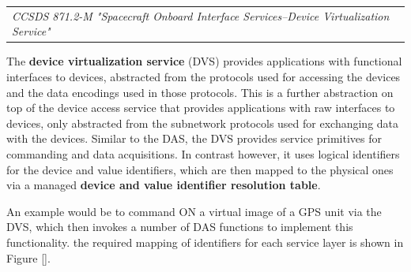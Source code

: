 \begin{tabular}{l}
\textit{CCSDS 871.2-M "Spacecraft Onboard Interface Services--Device Virtualization Service" \cite{CCSDS 871.2-M}} 
\end{tabular}

The \textbf{device virtualization service} (DVS) provides applications with functional interfaces to devices, abstracted from the protocols used for accessing the devices and the data encodings used in those protocols. This is a further abstraction on top of the device access service that provides applications with raw interfaces to devices, only abstracted from the subnetwork protocols used for exchanging data with the devices. Similar to the DAS, the DVS provides service primitives for commanding and data acquisitions. In contrast however, it uses logical identifiers for the device and value identifiers, which are then mapped to the physical ones via a managed \textbf{device and value identifier resolution table}.

An example would be to command ON a virtual image of a GPS unit via the DVS, which then invokes a number of DAS functions to implement this functionality. the required mapping of identifiers for each service layer is shown in Figure \ref{}.

